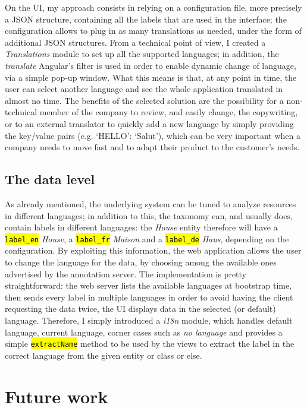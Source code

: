\documentclass[12pt,svgnames]{memoir}
\let\OldTexttt\texttt
\renewcommand{\texttt}[1]{\OldTexttt{\hl{#1}}}
\begin{document}
On the UI, my approach consists in relying on a configuration file, more
precisely a JSON structure, containing all the labels that are used in
the interface; the configuration allows to plug in as many translations
as needed, under the form of additional JSON structures. From a
technical point of view, I created a \emph{Translations} module to set
up all the supported languages; in addition, the \emph{translate}
Angular's filter is used in order to enable dynamic change of language,
via a simple pop-up window. What this means is that, at any point in
time, the user can select another language and see the whole application
translated in almost no time. The benefits of the selected solution are
the possibility for a non-technical member of the company to review, and
easily change, the copywriting, or to an external translator to quickly
add a new language by simply providing the key/value pairs (e.g.
`HELLO': `Salut'), which can be very important when a company needs to
move fast and to adapt their product to the customer's needs.

\subsection{The data level}\label{the-data-level}

As already mentioned, the underlying system can be tuned to analyze
resources in different languages; in addition to this, the taxonomy can,
and usually does, contain labels in different languages: the
\emph{House} entity therefore will have a \texttt{label\_en}
\emph{House}, a \texttt{label\_fr} \emph{Maison} and a
\texttt{label\_de} \emph{Haus}, depending on the configuration. By
exploiting this information, the web application allows the user to
change the language for the data, by choosing among the available ones
advertised by the annotation server. The implementation is pretty
straightforward: the web server lists the available languages at
bootstrap time, then sends every label in multiple languages in order to
avoid having the client requesting the data twice, the UI displays data
in the selected (or default) language. Therefore, I simply introduced a
\emph{i18n} module, which handles default language, current language,
corner cases such as \emph{no language} and provides a simple
\texttt{extractName} method to be used by the views to extract the label
in the correct language from the given entity or class or else.

\section{Future work}\label{future-work}
\end{document}
